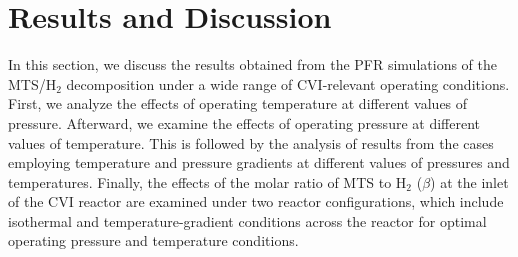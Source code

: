 \documentclass[final, letterpaper, square, comma, numbers, sort&compress]{elsarticle}
\begin{document}
\section{Results and Discussion}
In this section, we discuss the results obtained from the PFR simulations of the MTS/H$_2$ decomposition under a wide range of CVI-relevant operating conditions. First, we analyze the effects of operating temperature at different values of pressure. Afterward, we examine the effects of operating pressure at different values of temperature. This is followed by the analysis of results from the cases employing temperature and pressure gradients at different values of pressures and temperatures. Finally, the effects of the molar ratio of MTS to H$_2$ ($\beta$) at the inlet of the CVI reactor are examined under two reactor configurations, which include isothermal and temperature-gradient conditions across the reactor for optimal operating pressure and temperature conditions.
\end{document}
